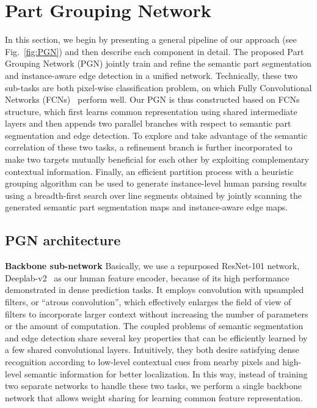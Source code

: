 \documentclass[runningheads]{llncs}
\begin{document}


\section{Part Grouping Network}
In this section, we begin by presenting a general pipeline of our approach (see Fig.~\ref{fig:PGN}) and then describe each component in detail. The proposed Part Grouping Network (PGN) jointly train and refine the semantic part segmentation and instance-aware edge detection in a unified network. Technically, these two sub-tasks are both pixel-wise classification problem, on which Fully Convolutional Networks (FCNs)~\cite{long2014fully} perform well. Our PGN is thus constructed based on FCNs structure, which first learns common representation using shared intermediate layers and then appends two parallel branches with respect to semantic part segmentation and edge detection. To explore and take advantage of the semantic correlation of these two tasks, a refinement branch is further incorporated to make two targets mutually beneficial for each other by exploiting complementary contextual information. Finally, an efficient partition process with a heuristic grouping algorithm can be used to generate instance-level human parsing results using a breadth-first search over line segments obtained by jointly scanning the generated semantic part segmentation maps and instance-aware edge maps.

\subsection{PGN architecture}

\textbf{Backbone sub-network} 
Basically, we use a repurposed ResNet-101 network, Deeplab-v2~\cite{chen2016deeplab} as our human feature encoder, because of its high performance demonstrated in dense prediction tasks. It employs convolution with upsampled filters, or “atrous convolution”, which effectively enlarges the field of view of filters to incorporate larger context without increasing the number of parameters or the amount of computation. The coupled problems of semantic segmentation and edge detection share several key properties that can be efficiently learned by a few shared convolutional layers. Intuitively, they both desire satisfying dense recognition according to low-level contextual cues from nearby pixels and high-level semantic information for better localization. In this way, instead of training two separate networks to handle these two tasks, we perform a single backbone network that allows weight sharing for learning common feature representation. 
\end{document}
